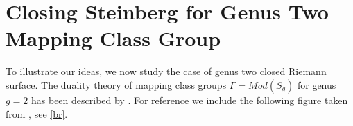 \documentclass[12pt]{amsart}
\theoremstyle{definition}
\theoremstyle{remark}
\newcommand{\sC}{\mathscr{C}}
\newcommand{\sT}{\mathscr{T}}
\begin{document}


























\section{Closing Steinberg for Genus Two Mapping Class Group}
To illustrate our ideas, we now study the case of genus two closed Riemann surface. The duality theory of mapping class groups $\Gamma=Mod(S_g)$ for genus $g=2$ has been described by \cite{Broaddus2012}. For reference we include the following figure taken from \cite[Fig.10]{Broaddus2012}, see \eqref{br}.%
\end{document}
